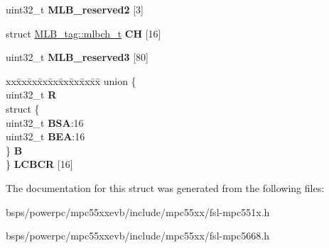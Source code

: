\begin{DoxyCompactItemize}
\begin{tabbing}
\end{tabbing}\item 
\mbox{\label{structMLB__tag_af01188e969c94e958ac81dc85c26a7b6}} 
uint32\+\_\+t {\bfseries M\+L\+B\+\_\+reserved2} \mbox{[}3\mbox{]}
\item 
\mbox{\label{structMLB__tag_adc69acf6923f2a4da5a3c354802243d5}} 
struct \mbox{\hyperlink{structMLB__tag_1_1mlbch__t}{M\+L\+B\+\_\+tag\+::mlbch\+\_\+t}} {\bfseries CH} \mbox{[}16\mbox{]}
\item 
\mbox{\label{structMLB__tag_a4b7b07f539314e89ea74b5316c71c18e}} 
uint32\+\_\+t {\bfseries M\+L\+B\+\_\+reserved3} \mbox{[}80\mbox{]}
\item 
\mbox{\label{structMLB__tag_a4be4271480e302a2d7e60f75b85a173e}} 
\begin{tabbing}
xx\=xx\=xx\=xx\=xx\=xx\=xx\=xx\=xx\=\kill
union \{\\
\>uint32\_t {\bfseries R}\\
\>struct \{\\
\>\>uint32\_t {\bfseries BSA}:16\\
\>\>uint32\_t {\bfseries BEA}:16\\
\>\} {\bfseries B}\\
\} {\bfseries LCBCR} \mbox{[}16\mbox{]}\\

\end{tabbing}\end{DoxyCompactItemize}


The documentation for this struct was generated from the following files\+:\begin{DoxyCompactItemize}
\item 
bsps/powerpc/mpc55xxevb/include/mpc55xx/fsl-\/mpc551x.\+h\item 
bsps/powerpc/mpc55xxevb/include/mpc55xx/fsl-\/mpc5668.\+h\end{DoxyCompactItemize}
